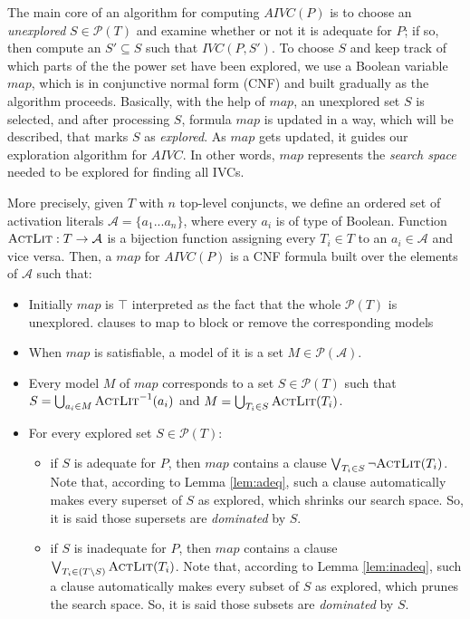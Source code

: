 The main core of an algorithm for computing $AIVC(P)$ is to choose an \emph{unexplored} $S \in \mathcal{P}(T)$ and examine whether or not it is adequate for $P$; if so, then compute an $S' \subseteq S$ such that $IVC(P, S')$.
To choose $S$ and keep track of which parts of the the power set
have been explored, we use a Boolean variable $map$, which is
in conjunctive normal form (CNF) and built gradually as the algorithm proceeds.
Basically, with the help of $map$, an unexplored set $S$ is selected, and after processing $S$,
formula $map$ is updated in a way, which will be described, that marks $S$ as \emph{explored}.
As $map$ gets updated, it guides our exploration algorithm for $AIVC$.
In other words, $map$ represents the \emph{search space} needed to be explored for finding all IVCs.

More precisely, given $T$ with $n$ top-level conjuncts,
we define an ordered
set of activation literals $\mathcal{A} = \{a_1...a_n\}$, where every $a_i$ is of type of Boolean. Function $\textsc{ActLit} : T \rightarrow \mathcal{A}$
is a bijection function assigning every $T_i \in T$ to an $a_i \in \mathcal{A}$ and vice versa.
Then, a $map$ for $AIVC(P)$ is a CNF formula built over the elements of $\mathcal{A}$ such that:
\begin{itemize}
  \item Initially $map$ is $\top$ interpreted as the fact that the whole $\mathcal{P}(T)$ is unexplored.
clauses to map to block or remove the corresponding models
  \item When $map$ is satisfiable, a model of it is a set
  $M \in \mathcal{P}(\mathcal{A})$.
  \item Every model $M$ of $map$ corresponds to a set $S \in \mathcal{P}(T)$ such that
$S = \bigcup_{a_i \in M} \textsc{ActLit} ^{-1} (a_i)$ and $M = \bigcup_{T_i \in S} \textsc{ActLit}(T_i)$.
  \item For every explored set $S \in \mathcal{P}(T)$:
  \begin{itemize}
    \item if $S$ is adequate for $P$, then $map$ contains a clause $\bigvee_{T_{i}\in S} \neg {\textsc{ActLit}(T_i)}$. Note that, according to Lemma \ref{lem:adeq}, such a clause automatically makes every superset of $S$ as explored, which shrinks our search space. So, it is said those supersets are \emph{dominated} by $S$.
    \item if $S$ is inadequate for $P$, then $map$ contains a clause $\bigvee_{T_{i}\in (T \setminus S)} \textsc{ActLit} (T_i)$. Note that, according to Lemma \ref{lem:inadeq}, such a clause automatically makes every subset of $S$ as explored, which prunes the search space. So, it is said those subsets are \emph{dominated} by $S$.
  \end{itemize}
\end{itemize}


